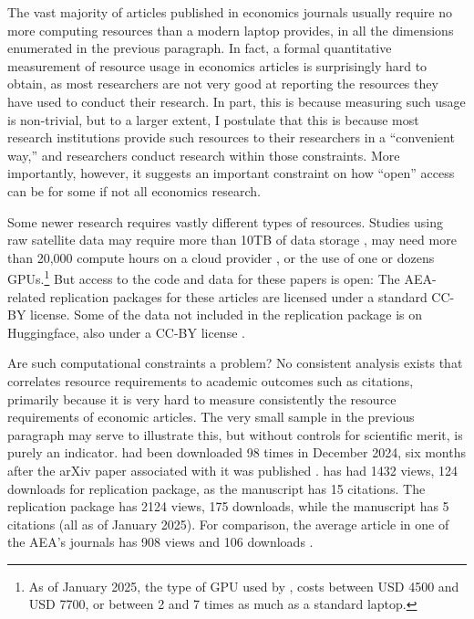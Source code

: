 \documentclass{article}
\begin{document}
{The vast majority of articles published in economics journals usually require no more computing resources than a modern laptop provides, in all the dimensions enumerated in the previous paragraph. In fact, a formal quantitative measurement of resource usage in economics articles is surprisingly hard to obtain, as most researchers are not very good at reporting the resources they have used to conduct their research. In part, this is because measuring such usage is non-trivial, but to a larger extent, I postulate that this is because most research institutions provide such resources to their researchers in a ``convenient way,'' and researchers conduct research within those constraints. More importantly, however, it suggests an important constraint on how ``open'' access can be for some if not all economics research.

Some newer research requires vastly different types of resources. Studies using raw satellite data may require more than 10TB of data storage \citep{khachiyan_using_2022,khachiyan_data_2022}, may need more than 20,000 compute hours on a cloud provider \citep{rudik_optimal_2020,rudik_data_2020}, or the use of one \citep{dell_deep_2024,dell_data_2025} or dozens \citep{khachiyan_data_2022} \acp{GPU}.\footnote{As of January 2025, the type of \ac{GPU} used by \citet{dell_data_2025}, costs between USD 4500 and USD 7700, or between 2 and 7 times as much as a standard laptop.} But  access to the code and data for these papers is open: The AEA-related replication packages for these articles are licensed under a standard \ac{CC-BY} license. Some of the data not included in the \citet{dell_data_2025} replication package is on Huggingface, also under a \ac{CC-BY} license \citep{silcock_newswire_2024}.

Are such computational constraints a problem? No consistent analysis exists that correlates resource requirements to academic outcomes such as citations, primarily because it is very hard to measure consistently the resource requirements of economic articles. The very small sample in the previous paragraph may serve to illustrate this, but without controls for scientific merit, is purely an indicator. \citet{silcock_newswire_2024} had been downloaded 98 times in December 2024, six months after the arXiv paper associated with it was published \citep{silcock_newswire_2024}. \citet{rudik_data_2020} has had  1432 views, 124 downloads for replication package, as the manuscript \citep{rudik_optimal_2020} has 15 citations. The replication package \citet{khachiyan_data_2022} has  2124 views, 175 downloads, while the manuscript \citep{khachiyan_using_2022} has 5 citations (all as of January 2025). For comparison, the average article in one of the \ac{AEA}'s journals has 908 views and 106 downloads \citep[Table 4]{vilhuber_report_2025}.

}
\end{document}
